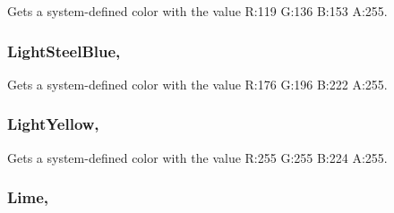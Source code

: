 Gets a system-\/defined color with the value R\+:119 G\+:136 B\+:153 A\+:255.

\hypertarget{structMicrosoft_1_1Xna_1_1Framework_1_1Color_a1b1d72dc66dcf084723af79f17179049}{}
\subsubsection[{Light\+Steel\+Blue}]{ Light\+Steel\+Blue\hspace{0.3cm}{\ttfamily [static]}, {\ttfamily [get]}}\label{structMicrosoft_1_1Xna_1_1Framework_1_1Color_a1b1d72dc66dcf084723af79f17179049}


Gets a system-\/defined color with the value R\+:176 G\+:196 B\+:222 A\+:255.

\hypertarget{structMicrosoft_1_1Xna_1_1Framework_1_1Color_aa353ae3271496f961552cbe2f2e02f81}{}
\subsubsection[{Light\+Yellow}]{ Light\+Yellow\hspace{0.3cm}{\ttfamily [static]}, {\ttfamily [get]}}\label{structMicrosoft_1_1Xna_1_1Framework_1_1Color_aa353ae3271496f961552cbe2f2e02f81}


Gets a system-\/defined color with the value R\+:255 G\+:255 B\+:224 A\+:255.

\hypertarget{structMicrosoft_1_1Xna_1_1Framework_1_1Color_a40ec9a7fb0a078cf351f9f49ae863605}{}
\subsubsection[{Lime}]{ Lime\hspace{0.3cm}{\ttfamily [static]}, {\ttfamily [get]}}\label{structMicrosoft_1_1Xna_1_1Framework_1_1Color_a40ec9a7fb0a078cf351f9f49ae863605}


